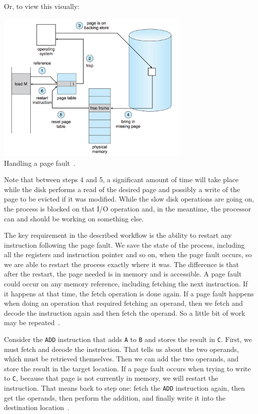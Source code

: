 Or, to view this visually:

\begin{center}
\includegraphics[width=0.7\textwidth]{images/handling-page-fault.png}\\
Handling a page fault~\cite{osc}.
\end{center}

Note that between steps 4 and 5, a significant amount of time will take place while the disk performs a read of the desired page and possibly a write of the page to be evicted if it was modified. While the slow disk operations are going on, the process is blocked on that I/O operation and, in the meantime, the processor can and should be working on something else.

The key requirement in the described workflow is the ability to restart any instruction following the page fault. We save the state of the process, including all the registers and instruction pointer and so on, when the page fault occurs, so we are able to restart the process exactly where it was. The difference is that after the restart, the page needed is in memory and is accessible. A page fault could occur on any memory reference, including fetching the next instruction. If it happens at that time, the fetch operation is done again. If a page fault happens when doing an operation that required fetching an operand, then we fetch and decode the instruction again and then fetch the operand. So a little bit of work may be repeated~\cite{osc}.

Consider the \texttt{ADD} instruction that adds \texttt{A} to \texttt{B} and stores the result in \texttt{C}. First, we must fetch and decode the instruction. That tells us about the two operands, which must be retrieved themselves. Then we can add the two operands, and store the result in the target location. If a page fault occurs when trying to write to \texttt{C}, because that page is not currently in memory, we will restart the instruction. That means back to step one: fetch the \texttt{ADD} instruction again, then get the operands, then perform the addition, and finally write it into the destination location~\cite{osc}.

